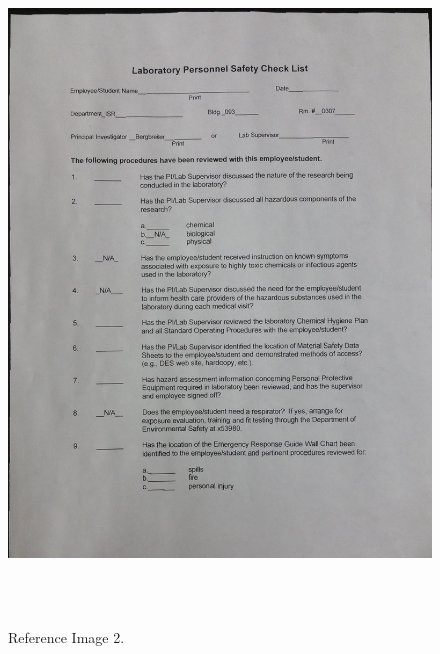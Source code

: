 \begin{figure}[th]
	\centering
	\includegraphics[height=18cm ]{Figures/reference_image2}
	\caption[Reference Image 2]{Reference Image 2.}
	\label{fig:ReferenceImage2}
\end{figure}
\pagebreak
